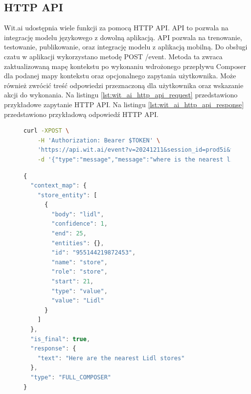 \subsection{HTTP API}
Wit.ai udostępnia wiele funkcji za pomocą HTTP API. API to pozwala na integrację modelu językowego z dowolną aplikacją. API pozwala na trenowanie, testowanie, publikowanie, oraz integrację modelu z aplikacją mobilną. Do obsługi czatu w aplikacji wykorzystano metodę POST /event. Metoda ta zwraca zaktualizowaną mapę kontekstu po wykonaniu wdrożonego przepływu Composer dla podanej mapy kontekstu oraz opcjonalnego zapytania użytkownika. Może również zwrócić treść odpowiedzi przeznaczoną dla użytkownika oraz wskazanie akcji do wykonania. \cite{witai_http_api} Na listingu \ref{lst:wit_ai_http_api_request} przedstawiono przykładowe zapytanie HTTP API.
Na listingu \ref{lst:wit_ai_http_api_response} przedstawiono przykładową odpowiedź HTTP API.

\begin{figure}[H]
\begin{lstlisting}[language=bash, caption=Przykładowe zapytanie HTTP API, label=lst:wit_ai_http_api_request]
    curl -XPOST \
    -H 'Authorization: Bearer $TOKEN' \
    'https://api.wit.ai/event?v=20241211&session_id=prod5i&tag=1.0&context_map=%7B%7D' \
    -d '{"type":"message","message":"where is the nearest lidl?"}'  
\end{lstlisting}
\end{figure}
\label{lst:wit_ai_http_api_request}

\begin{figure}[H]
\begin{lstlisting}[language=javascript, caption=Przykładowe zapytanie HTTP API, label=lst:wit_ai_http_api_request]
{
  "context_map": {
    "store_entity": [
      {
        "body": "lidl",
        "confidence": 1,
        "end": 25,
        "entities": {},
        "id": "955144219872453",
        "name": "store",
        "role": "store",
        "start": 21,
        "type": "value",
        "value": "Lidl"
      }
    ]
  },
  "is_final": true,
  "response": {
    "text": "Here are the nearest Lidl stores"
  },
  "type": "FULL_COMPOSER"
}
\end{lstlisting}
\end{figure}
\label{lst:wit_ai_http_api_response}

